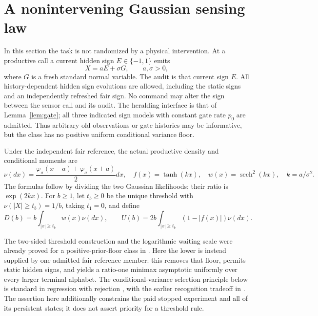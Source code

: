 \section{A nonintervening Gaussian sensing law}
\label{sec:gaussian}
In this section the task is not randomized by a physical intervention. At a productive call a current hidden sign $E\in\{-1,1\}$ emits
\begin{equation}\label{eq:sensor}
 X=aE+\sigma G,\qquad a,\sigma>0,
\end{equation}
where $G$ is a fresh standard normal variable. The audit is that current sign $E$. All history-dependent hidden sign evolutions are allowed, including the static signs and an independently refreshed fair sign. No command may alter the sign between the sensor call and its audit. The heralding interface is that of Lemma~\ref{lem:gate}; all three indicated sign models with constant gate rate $p_0$ are admitted. Thus arbitrary old observations or gate histories may be informative, but the class has no positive uniform conditional variance floor.

Under the independent fair reference, the actual productive density and conditional moments are
\begin{equation}\label{eq:gaussian-moments}
 \nu(dx)=\frac{\varphi_\sigma(x-a)+\varphi_\sigma(x+a)}2dx,
 \quad f(x)=\tanh(kx),\quad w(x)=\operatorname{sech}^2(kx),
 \quad k=a/\sigma^2.
\end{equation}
The formulas follow by dividing the two Gaussian likelihoods; their ratio is $\exp(2kx)$. For $b\ge1$, let $t_b\ge0$ be the unique threshold with $\nu(|X|\ge t_b)=1/b$, taking $t_1=0$, and define
\begin{equation}\label{eq:D}
 D(b)=b\int_{|x|\ge t_b}w(x)\nu(dx),\qquad
 U(b)=2b\int_{|x|\ge t_b}(1-|f(x)|)\nu(dx).
\end{equation}

The two-sided threshold construction and the logarithmic waiting scale were already proved for a positive-prior-floor class in \cite{GTF52}. Here the lower is instead supplied by one admitted fair reference member: this removes that floor, permits static hidden signs, and yields a ratio-one minimax asymptotic uniformly over every larger terminal alphabet. The conditional-variance selection principle below is standard in regression with rejection \cite{DHZ}, with the earlier recognition tradeoff in \cite{Chow}. The assertion here additionally constrains the paid stopped experiment and all of its persistent states; it does not assert priority for a threshold rule.

